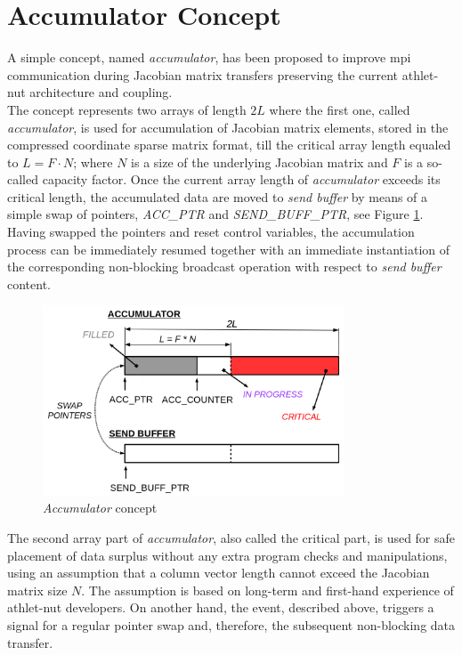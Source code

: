 \section{Accumulator Concept}
\label{sec:accumulator-approach}



A simple concept, named \textit{accumulator}, has been proposed to improve \acrshort{mpi} communication during Jacobian matrix transfers preserving the current \acrshort{athlet}-\acrshort{nut} architecture and coupling.\\


The concept represents two arrays of length $2L$ where the first one, called \textit{accumulator}, is used for accumulation of Jacobian matrix elements, stored in the compressed coordinate sparse matrix format, till the critical array length equaled to $L = F \cdot N$; where $N$ is a size of the underlying Jacobian matrix and $F$ is a so-called capacity factor. Once the current array length of \textit{accumulator} exceeds its critical length, the accumulated data are moved to \textit{send buffer} by means of a simple swap of pointers, \textit{ACC\_PTR} and \textit{SEND\_BUFF\_PTR}, see Figure \ref{fig:accumulator-concept}. Having swapped the pointers and reset control variables, the accumulation process can be immediately resumed together with an immediate instantiation of the corresponding non-blocking broadcast operation with respect to \textit{send buffer} content.\\


\begin{figure}[htpb]
  \centering
  \includegraphics[width=0.8\textwidth]{figures/chapter-3/accumulator-concept.png}
  \caption{\textit{Accumulator} concept} \label{fig:accumulator-concept}
\end{figure}


The second array part of \textit{accumulator}, also called the critical part, is used for safe placement of data surplus without any extra program checks and manipulations, using an assumption that a column vector length cannot exceed the Jacobian matrix size $N$. The assumption is based on long-term and first-hand experience of \acrshort{athlet}-\acrshort{nut} developers. On another hand, the event, described above, triggers a signal for a regular pointer swap and, therefore, the subsequent non-blocking data transfer.\\


